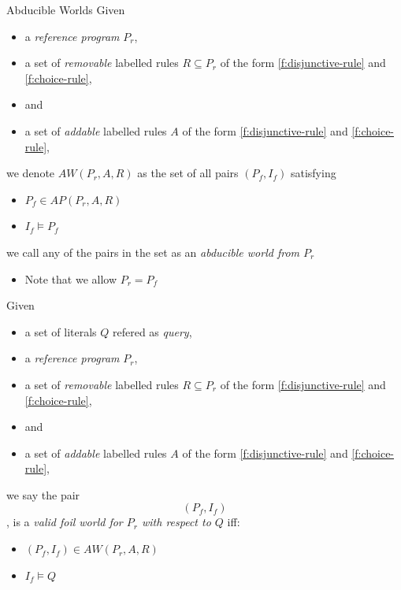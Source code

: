 %
\begin{definition}{Abducible Worlds}
  Given
  \begin{itemize}
    \item a \emph{reference program} $P_r$,
    \item a set of \emph{removable} labelled rules $R \subseteq P_r$ of the form \eqref{f:disjunctive-rule} and \eqref{f:choice-rule},
    \item and
    \item a set of \emph{addable} labelled rules $A$ of the form \eqref{f:disjunctive-rule} and \eqref{f:choice-rule},
  \end{itemize}
  we denote $AW(P_r, A, R)$ as the set of all pairs $(P_f, I_f)$ satisfying
  \begin{itemize}
    \item $P_f \in AP(P_r, A, R)$
    \item $I_f \models P_f$
  \end{itemize}
  we call any of the pairs in the set as an \emph{abducible world from $P_r$}
\end{definition}
%
\begin{itemize}
  \item Note that we allow $P_r = P_f$
\end{itemize}
%

%
\begin{definition}
  Given
  \begin{itemize}
    \item a set of literals $Q$ refered as \emph{query},
    \item a \emph{reference program} $P_r$,
    \item a set of \emph{removable} labelled rules $R \subseteq P_r$ of the form \eqref{f:disjunctive-rule} and \eqref{f:choice-rule},
    \item and
    \item a set of \emph{addable} labelled rules $A$ of the form \eqref{f:disjunctive-rule} and \eqref{f:choice-rule},
  \end{itemize}
  we say the pair
  \[(P_f, I_f)\],
  is a \emph{valid foil world for $P_r$ with respect to $Q$} iff:
  \begin{itemize}
    \item $(P_f, I_f) \in AW(P_r, A, R)$
    \item $I_f \models Q$
  \end{itemize}
\end{definition}
%
